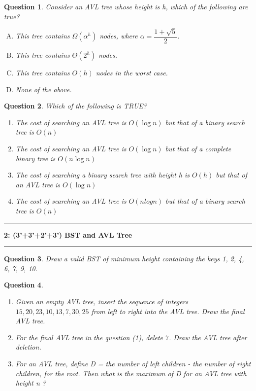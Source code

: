 \documentclass[10.5pt]{article}
\newcommand\question[2]{\vspace{.25in}\hrule\textbf{#1: #2}\vspace{.5em}\hrule\vspace{.10in}}
\newtheorem{Q}{Question}
\begin{document}
	\begin{Q}
		Consider an AVL tree whose height is h, which of the following are true?
		\begin{enumerate}[(A)]
			\item This tree contains $\Omega(\alpha^h)$ nodes, where $\alpha = \dfrac{1+\sqrt{5}}{2}$.
			\item This tree contains $\Theta(2^h)$ nodes.
			\item This tree contains $O(h)$ nodes in the worst case.
			\item None of the above.
		\end{enumerate}
	\end{Q}
	
	
	\begin{Q}
		Which of the following is TRUE?
		\begin{enumerate}
			\item[(A)] The cost of searching an AVL tree is $O(\log n)$ but that of a binary search tree is $O(n)$
			\item[(B)] The cost of searching an AVL tree is $O(\log n)$ but that of a complete binary tree is $O(n \log n)$
			\item[(C)] The cost of searching a binary search tree with height h is $O(h)$ but that of an AVL tree is $O(\log n)$
			\item[(D)] The cost of searching an AVL tree is $O(n log n)$ but that of a binary search tree is $O(n)$
		\end{enumerate}
	\end{Q}
\vspace{0.5cm}
\pagebreak

\question{2}{(3'+3'+2'+3') BST and AVL Tree}
\begin{Q}
Draw a valid BST of minimum height containing the keys 1, 2, 4, 6, 7, 9, 10.
\vspace{5cm}

\end{Q}
	
\begin{Q}
	\begin{enumerate}[(1)]
		\item 
		Given an empty AVL tree, insert the sequence of integers $15, 20, 23, 10, 13, 7, 30, 25$ from left to right into the AVL tree. Draw the final AVL tree.\\
		
		\vspace{30ex}
		
		\item
		For the final AVL tree in the question (1), delete $7$. Draw the AVL tree after deletion.\\
		\vspace{30ex}
		\item
		For an AVL tree, define D = the number of left children - the number of right children,  for the root. Then what is the maximum of D for an AVL tree with height n ?\\
		\vspace{30ex}
	\end{enumerate}
	
	
\end{Q}
\end{document}

